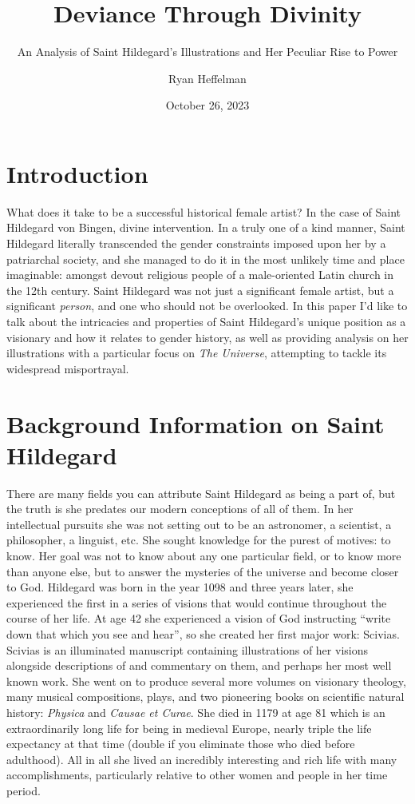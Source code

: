 \documentclass{turabian-researchpaper}
\title{Deviance Through Divinity}
\subtitle{An Analysis of Saint Hildegard's Illustrations and Her Peculiar Rise to Power}
\author{Ryan Heffelman}
\date{October 26, 2023}
\begin{document}
\maketitle

\section{Introduction}

    What does it take to be a successful historical female artist? In the case of Saint Hildegard von Bingen, divine intervention. In a truly one of a kind manner, Saint Hildegard literally transcended the gender constraints imposed upon her by a patriarchal society, and she managed to do it in the most unlikely time and place imaginable: amongst devout religious people of a male-oriented Latin church in the 12th century. Saint Hildegard was not just a significant female artist, but a significant \emph{person}, and one who should not be overlooked. In this paper I'd like to talk about the intricacies and properties of Saint Hildegard's unique position as a visionary and how it relates to gender history, as well as providing analysis on her illustrations with a particular focus on \emph{The Universe}, attempting to tackle its widespread misportrayal.


\section{Background Information on Saint Hildegard}

    There are many fields you can attribute Saint Hildegard as being a part of, but the truth is she predates our modern conceptions of all of them. In her intellectual pursuits she was not setting out to be an astronomer, a scientist, a philosopher, a linguist, etc. She sought knowledge for the purest of motives: to know. Her goal was not to know about any one particular field, or to know more than anyone else, but to answer the mysteries of the universe and become closer to God. Hildegard was born in the year 1098 and three years later, she experienced the first in a series of visions that would continue throughout the course of her life.\autocite[77]{motc} At age 42 she experienced a vision of God instructing ``write down that which you see and hear'', so she created her first major work: Scivias.\autocite{scivias}\autocite[8]{vw} Scivias is an illuminated manuscript containing illustrations of her visions alongside descriptions of and commentary on them, and perhaps her most well known work. She went on to produce several more volumes on visionary theology, many musical compositions, plays, and two pioneering books on scientific natural history: \emph{Physica} and \emph{Causae et Curae}. She died in 1179 at age 81 which is an extraordinarily long life for being in medieval Europe, nearly triple the life expectancy at that time (double if you eliminate those who died before adulthood).\autocite[25]{bitel} All in all she lived an incredibly interesting and rich life with many accomplishments, particularly relative to other women and people in her time period.
\end{document}
